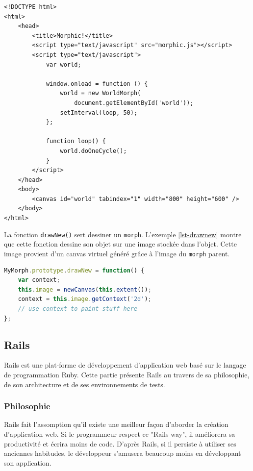 \begin{lstlisting}[caption={Exemple d'utilisation de \texttt{morphic.js}},label=lst-doonecycle,language=HTML5,alsolanguage=JavaScript]
<!DOCTYPE html>
<html>
    <head>
        <title>Morphic!</title>
        <script type="text/javascript" src="morphic.js"></script>
        <script type="text/javascript">
            var world;

            window.onload = function () {
                world = new WorldMorph(
                    document.getElementById('world'));
                setInterval(loop, 50);
            };

            function loop() {
                world.doOneCycle();
            }
        </script>
    </head>
    <body>
        <canvas id="world" tabindex="1" width="800" height="600" />
    </body>
</html>
\end{lstlisting}

La fonction \texttt{drawNew()} sert dessiner un \texttt{morph}. L'exemple \ref{lst-drawnew} montre que cette fonction dessine son objet sur une image stockée dans l'objet. Cette image provient d'un canvas virtuel généré grâce à l'image du \texttt{morph} parent.

\begin{lstlisting}[caption={Modèle pour la fonction \texttt{drawNew()}},label=lst-drawnew,language=JavaScript]
MyMorph.prototype.drawNew = function() {
    var context;
    this.image = newCanvas(this.extent());
    context = this.image.getContext('2d');
    // use context to paint stuff here
};
\end{lstlisting}

\subsection{Rails}
\label{rails} 
Rails est une plat-forme de développement d'application web basé sur le langage de programmation Ruby. Cette partie présente Rails au travers de sa philosophie, de son architecture et de ses environnements de tests.

\subsubsection{Philosophie}
Rails fait l'assomption qu'il existe une meilleur façon d'aborder la création d'application web. Si le programmeur respect ce "Rails way", il améliorera sa productivité et écrira moins de code. D'après Rails, si il persiste à utiliser ses anciennes habitudes, le développeur s'amusera beaucoup moins en développant son application.

